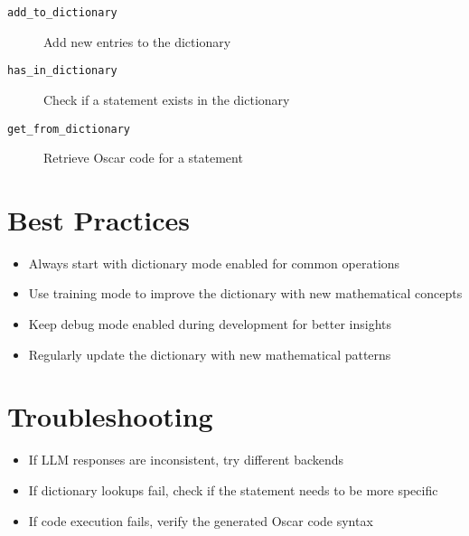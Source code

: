 \documentclass[11pt,a4paper]{article}
\begin{document}
\begin{description}
    \item[\texttt{add\_to\_dictionary}] Add new entries to the dictionary
    \item[\texttt{has\_in\_dictionary}] Check if a statement exists in the dictionary
    \item[\texttt{get\_from\_dictionary}] Retrieve Oscar code for a statement
\end{description}

\section{Best Practices}

\begin{itemize}
    \item Always start with dictionary mode enabled for common operations
    \item Use training mode to improve the dictionary with new mathematical concepts
    \item Keep debug mode enabled during development for better insights
    \item Regularly update the dictionary with new mathematical patterns
\end{itemize}

\section{Troubleshooting}

\begin{itemize}
    \item If LLM responses are inconsistent, try different backends
    \item If dictionary lookups fail, check if the statement needs to be more specific
    \item If code execution fails, verify the generated Oscar code syntax
\end{itemize}
\end{document}
